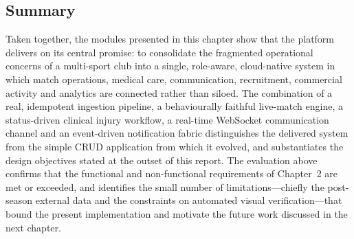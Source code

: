 \subsection{Summary}
Taken together, the modules presented in this chapter show that the platform delivers on its central promise: to consolidate the
fragmented operational concerns of a multi-sport club into a single, role-aware, cloud-native system in which match operations,
medical care, communication, recruitment, commercial activity and analytics are connected rather than siloed. The combination of a
real, idempotent ingestion pipeline, a behaviourally faithful live-match engine, a status-driven clinical injury workflow, a
real-time WebSocket communication channel and an event-driven notification fabric distinguishes the delivered system from the simple
CRUD application from which it evolved, and substantiates the design objectives stated at the outset of this report. The evaluation
above confirms that the functional and non-functional requirements of Chapter~2 are met or exceeded, and identifies the small number
of limitations---chiefly the post-season external data and the constraints on automated visual verification---that bound the present
implementation and motivate the future work discussed in the next chapter.
